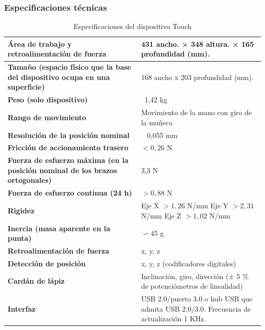 \documentclass[a4paper,11pt, oneside]{book}
\begin{document}
\subsubsection{Especificaciones técnicas}
\renewcommand{\arraystretch}{1.3}
\begin{table}[H]
\begin{center}
	\begin{tabular}{ |m{6cm}|m{6cm}| } 
		\hline
		\textbf{Área de trabajo y retroalimentación de fuerza} & 431 ancho. × 348 altura. × 165 profundidad (mm). \\ 
		\hline
		\textbf{Tamaño (espacio físico que la base del dispositivo ocupa en una superficie)} & 168 ancho x 203 profundidad (mm).  \\ 
		\hline
		\textbf{Peso (solo dispositivo)} & ~1,42 kg  \\ 
		\hline
		\textbf{Rango de movimiento} & Movimiento de la mano con giro de la muñeca \\
		\hline
		\textbf{Resolución de la posición nominal} & ~ 0,055 mm \\
		\hline
		\textbf{Fricción de accionamiento trasero} & $< 0,26$ N \\
		\hline
		\textbf{Fuerza de esfuerzo máxima (en la posición nominal de los brazos ortogonales)} & 3,3 N \\
		\hline
		\textbf{Fuerza de esfuerzo continua (24 h)} & $>0,88$ N \\
		\hline
		\textbf{Rigidez} & \parbox[t]{11em}{Eje X $> 1,26$ N/mm \\ Eje Y $> 2,31$ N/mm  \\ Eje Z $> 1,02$ N/mm} \\
		\hline
		\textbf{Inercia (masa aparente en la punta)} & $\backsim45$ g \\
		\hline
		\textbf{Retroalimentación de fuerza} & x, y, z \\
		\hline
		\textbf{Detección de posición} & x, y, z (codificadores digitales) \\
		\hline
		\textbf{Cardán de lápiz} & Inclinación, giro, dirección (± 5 \% de potenciómetros de linealidad) \\
		\hline
		\textbf{Interfaz} & USB 2.0/puerto 3.0 o hub USB que admita USB 2.0/3.0.
		Frecuencia de actualización 1 KHz. \\
		\hline
	\end{tabular}
\end{center}
\caption{Especificaciones del dispositivo Touch}
\label{table:touch}
\end{table}
\end{document}
